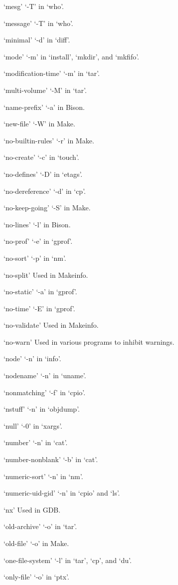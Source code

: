 `mesg'
     `-T' in `who'.

`message'
     `-T' in `who'.

`minimal'
     `-d' in `diff'.

`mode'
     `-m' in `install', `mkdir', and `mkfifo'.

`modification-time'
     `-m' in `tar'.

`multi-volume'
     `-M' in `tar'.

`name-prefix'
     `-a' in Bison.

`new-file'
     `-W' in Make.

`no-builtin-rules'
     `-r' in Make.

`no-create'
     `-c' in `touch'.

`no-defines'
     `-D' in `etags'.

`no-dereference'
     `-d' in `cp'.

`no-keep-going'
     `-S' in Make.

`no-lines'
     `-l' in Bison.

`no-prof'
     `-e' in `gprof'.

`no-sort'
     `-p' in `nm'.

`no-split'
     Used in Makeinfo.

`no-static'
     `-a' in `gprof'.

`no-time'
     `-E' in `gprof'.

`no-validate'
     Used in Makeinfo.

`no-warn'
     Used in various programs to inhibit warnings.

`node'
     `-n' in `info'.

`nodename'
     `-n' in `uname'.

`nonmatching'
     `-f' in `cpio'.

`nstuff'
     `-n' in `objdump'.

`null'
     `-0' in `xargs'.

`number'
     `-n' in `cat'.

`number-nonblank'
     `-b' in `cat'.

`numeric-sort'
     `-n' in `nm'.

`numeric-uid-gid'
     `-n' in `cpio' and `ls'.

`nx'
     Used in GDB.

`old-archive'
     `-o' in `tar'.

`old-file'
     `-o' in Make.

`one-file-system'
     `-l' in `tar', `cp', and `du'.

`only-file'
     `-o' in `ptx'.

